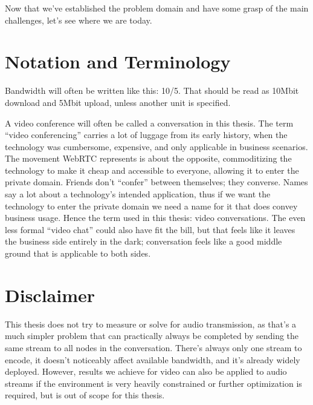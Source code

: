 Now that we've established the problem domain and have some grasp of the main challenges, let's see where we are today.


\section{Notation and Terminology}

Bandwidth will often be written like this: 10/5. That should be read as 10Mbit download and 5Mbit upload, unless another unit is specified.

A video conference will often be called a conversation in this thesis. The term ``video conferencing'' carries a lot of luggage from its early history, when the technology was cumbersome, expensive, and only applicable in business scenarios. The movement WebRTC represents is about the opposite, commoditizing the technology to make it cheap and accessible to everyone, allowing it to enter the private domain. Friends don't ``confer'' between themselves; they converse. Names say a lot about a technology's intended application, thus if we want the technology to enter the private domain we need a name for it that does convey business usage. Hence the term used in this thesis: video conversations. The even less formal ``video chat'' could also have fit the bill, but that feels like it leaves the business side entirely in the dark; conversation feels like a good middle ground that is applicable to both sides.


\section{Disclaimer}

This thesis does not try to measure or solve for audio transmission, as that's a much simpler problem that can practically always be completed by sending the same stream to all nodes in the conversation. There's always only one stream to encode, it doesn't noticeably affect available bandwidth, and it's already widely deployed. However, results we achieve for video can also be applied to audio streams if the environment is very heavily constrained or further optimization is required, but is out of scope for this thesis.
